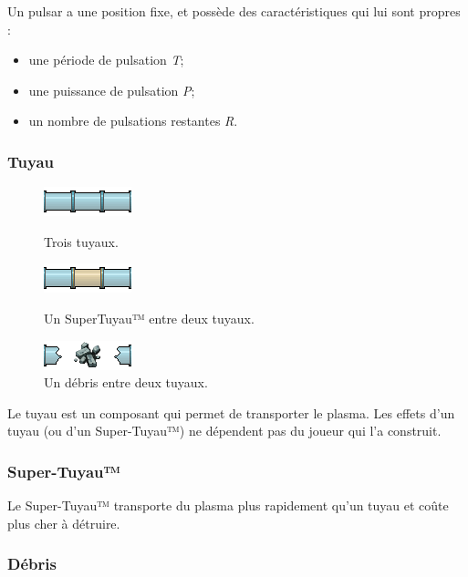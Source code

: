 Un pulsar a une position fixe, et possède des caractéristiques qui lui
sont propres :

\begin{itemize}
\tightlist
\item
  une période de pulsation \emph{T};
\item
  une puissance de pulsation \emph{P};
\item
  un nombre de pulsations restantes \emph{R}.
\end{itemize}



\subsubsection{Tuyau}\label{tuyau}

\begin{figure}
    \centering
    \includegraphics{asset/tuyau.png}
    \caption*{Trois tuyaux.}

    \vspace{1cm}

    \includegraphics{asset/supertuyau.png}
    \caption*{Un SuperTuyau™ entre deux tuyaux.}

    \vspace{1cm}

    \includegraphics{asset/debris.png}
    \caption*{Un débris entre deux tuyaux.}
\end{figure}

Le tuyau est un composant qui permet de transporter le plasma. Les
effets d'un tuyau (ou d'un Super-Tuyau™) ne dépendent pas du joueur qui
l'a construit.

\subsubsection{Super-Tuyau™}\label{super-tuyau}

Le Super-Tuyau™ transporte du plasma plus rapidement qu'un tuyau et
coûte plus cher à détruire.

\subsubsection{Débris}\label{duxe9bris}

